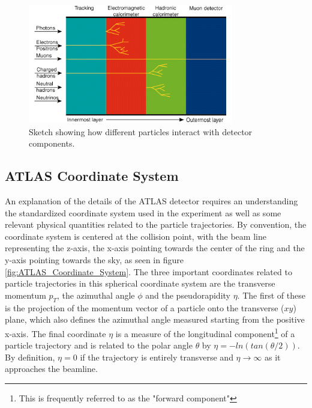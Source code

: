 \begin{figure}
\centering
    \includegraphics[width=0.8\textwidth]{images/Detector_Interactions.png}
    \caption{Sketch showing how different particles interact with detector components.}
    \label{fig:Detector_Interactions}
\end{figure}

\subsection{ATLAS Coordinate System}

An explanation of the details of the ATLAS detector requires an understanding the standardized coordinate system used in the 
experiment as well as some relevant physical quantities related to the particle trajectories. By convention, the coordinate 
system is centered at the collision point, with the beam line representing the z-axis, the x-axis pointing towards the center 
of the ring and the y-axis pointing towards the sky, as seen in figure \ref{fig:ATLAS_Coordinate_System}. The three important 
coordinates related to particle trajectories in this spherical coordinate system are the transverse momentum $p_T$, the 
azimuthal angle $\phi$ and the pseudorapidity $\eta$. The first of these is the projection of the momentum vector of a 
particle onto the transverse ($xy$) plane, which also defines the azimuthal angle measured starting from the positive x-axis. 
The final coordinate $\eta$ is a measure of the longitudinal component\footnote{This is frequently referred to as the "forward 
component"} of a particle trajectory and is related to the polar angle $\theta$ by $\eta = -ln(tan(\theta/2))$. By definition, 
$\eta = 0$ if the trajectory is entirely transverse and $\eta \rightarrow \infty$ as it approaches the beamline.

